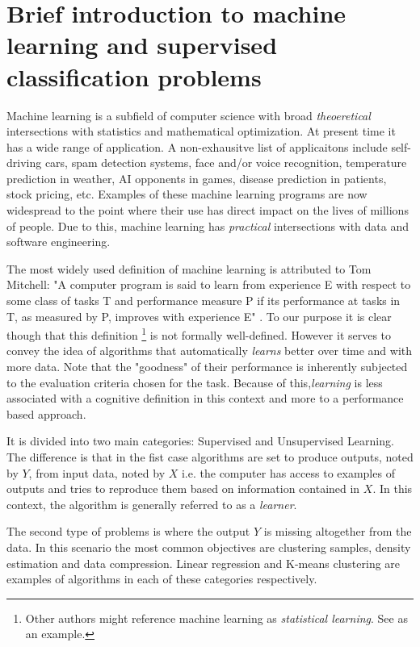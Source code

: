
\section{ Brief introduction to machine learning and supervised classification problems}

Machine learning is a subfield of computer science with broad \textit{theoeretical} intersections with statistics and mathematical optimization. At present time it has a wide range of application. A non-exhausitve list of applicaitons include self-driving cars, spam detection systems, face and/or voice recognition, temperature prediction in weather, AI opponents in games, disease prediction in patients, stock pricing, etc. Examples of these machine learning programs are now widespread to the point where their use has direct impact on the lives of millions of people. Due to this, machine learning has \textit{practical} intersections with data and software engineering.

The most widely used definition of machine learning is attributed to Tom Mitchell: 	 
"A computer program is said to learn from experience E with respect to some class of tasks T and performance measure P if its performance at tasks in T, as measured by P, improves with experience E" \cite{Mitchell-MLearning}. To our purpose it is clear though that this definition \footnote{Other authors might reference machine learning as \textit{statistical learning}. See \cite{hastie-elemstatslearn} as an example.} is not formally well-defined. However it serves to convey the idea of algorithms that automatically \textit{learns} better over time and with more data. Note that the "goodness" of their performance is inherently subjected to the evaluation criteria chosen for the task. Because of this,\textit{learning} is less associated with a cognitive definition in this context and more to a performance based approach.

It is divided into two main categories: Supervised and Unsupervised Learning. The difference is that in the fist case algorithms are set to produce outputs, noted by $Y$, from input data, noted by $X$ i.e. the computer has access to examples of outputs and tries to reproduce them based on information contained in $X$. In this context, the algorithm is generally referred to as a \textit{learner}.

The second type of problems is where the output $Y$ is missing altogether from the data. In this scenario the most common objectives are clustering samples, density estimation and data compression. Linear regression and K-means clustering are examples of algorithms in each of these categories respectively.

